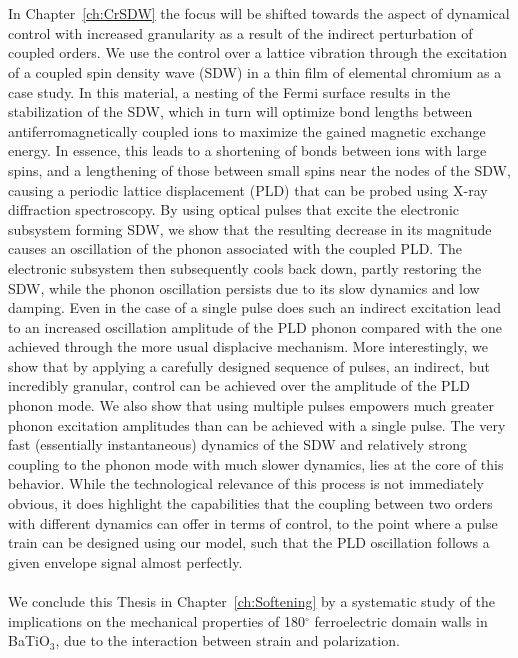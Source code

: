 \\\\
In Chapter~\ref{ch:CrSDW} the focus will be shifted towards the aspect of dynamical control with increased granularity as a result of the indirect perturbation of coupled orders.
We use the control over a lattice vibration through the excitation of a coupled spin density wave (SDW) in a thin film of elemental chromium as a case study.
In this material, a nesting of the Fermi surface results in the stabilization of the SDW, which in turn will optimize bond lengths between antiferromagnetically coupled ions to maximize the gained magnetic exchange energy.
In essence, this leads to a shortening of bonds between ions with large spins, and a lengthening of those between small spins near the nodes of the SDW, causing a periodic lattice displacement (PLD) that can be probed using X-ray diffraction spectroscopy.
By using optical pulses that excite the electronic subsystem forming SDW, we show that the resulting  decrease in its magnitude causes an oscillation of the phonon associated with the coupled PLD.
The electronic subsystem then subsequently cools back down, partly restoring the SDW, while the phonon oscillation persists due to its slow dynamics and low damping.
Even in the case of a single pulse does such an indirect excitation lead to an increased oscillation amplitude of the PLD phonon compared with the one achieved through the more usual displacive mechanism.
More interestingly, we show that by applying a carefully designed sequence of pulses, an indirect, but incredibly granular, control can be achieved over the amplitude of the PLD phonon mode.
We also show that using multiple pulses empowers much greater phonon excitation amplitudes than can be achieved with a single pulse.
The very fast (essentially instantaneous) dynamics of the SDW and relatively strong coupling to the phonon mode with much slower dynamics, lies at the core of this behavior.
While the technological relevance of this process is not immediately obvious, it does highlight the capabilities that the coupling between two orders with different dynamics can offer in terms of control, to the point where a pulse train can be designed using our model, such that the PLD oscillation follows a given envelope signal almost perfectly.
\\\\
We conclude this Thesis in Chapter~\ref{ch:Softening} by a systematic study of the implications on the mechanical properties of 180$^\circ$ ferroelectric domain walls in BaTiO$_3$, due to the interaction between strain and polarization.
